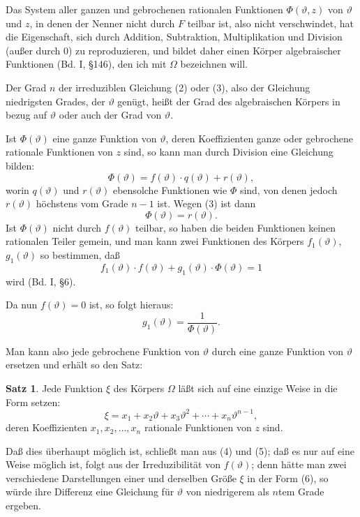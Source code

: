 \documentclass[12pt,a4paper]{article}
\theoremstyle{definition}
\newtheorem{satz}{Satz}[section]
\begin{document}
Das System aller ganzen und gebrochenen rationalen Funktionen $\Phi(\vartheta, z)$ von $\vartheta$ und $z$, in denen der Nenner nicht durch $F$ teilbar ist, also nicht verschwindet, hat die Eigenschaft, sich durch Addition, Subtraktion, Multiplikation und Division (außer durch 0) zu reproduzieren, und bildet daher einen Körper algebraischer Funktionen (Bd. I, \S 146), den ich mit $\Omega$ bezeichnen will.

Der Grad $n$ der irreduziblen Gleichung (2) oder (3), also der Gleichung niedrigsten Grades, der $\vartheta$ genügt, heißt der Grad des algebraischen Körpers in bezug auf $\vartheta$ oder auch der Grad von $\vartheta$.

Ist $\Phi(\vartheta)$ eine ganze Funktion von $\vartheta$, deren Koeffizienten ganze oder gebrochene rationale Funktionen von $z$ sind, so kann man durch Division eine Gleichung bilden:
\[\Phi(\vartheta) = f(\vartheta) \cdot q(\vartheta) + r(\vartheta),\]
worin $q(\vartheta)$ und $r(\vartheta)$ ebensolche Funktionen wie $\Phi$ sind, von denen jedoch $r(\vartheta)$ höchstens vom Grade $n-1$ ist. Wegen (3) ist dann
\[\Phi(\vartheta) = r(\vartheta).\]
Ist $\Phi(\vartheta)$ nicht durch $f(\vartheta)$ teilbar, so haben die beiden Funktionen keinen rationalen Teiler gemein, und man kann zwei Funktionen des Körpers $f_1(\vartheta)$, $g_1(\vartheta)$ so bestimmen, daß
\[f_1(\vartheta) \cdot f(\vartheta) + g_1(\vartheta) \cdot \Phi(\vartheta) = 1\]
wird (Bd. I, \S 6).

Da nun $f(\vartheta) = 0$ ist, so folgt hieraus:
\begin{equation}
g_1(\vartheta) = \frac{1}{\Phi(\vartheta)}.
\end{equation}

Man kann also jede gebrochene Funktion von $\vartheta$ durch eine ganze Funktion von $\vartheta$ ersetzen und erhält so den Satz:

\begin{satz}
Jede Funktion $\xi$ des Körpers $\Omega$ läßt sich auf eine einzige Weise in die Form setzen:
\begin{equation}
\xi = x_1 + x_2 \vartheta + x_3 \vartheta^2 + \cdots + x_n \vartheta^{n-1},
\end{equation}
deren Koeffizienten $x_1, x_2, \ldots, x_n$ rationale Funktionen von $z$ sind.
\end{satz}

Daß dies überhaupt möglich ist, schließt man aus (4) und (5); daß es nur auf eine Weise möglich ist, folgt aus der Irreduzibilität von $f(\vartheta)$; denn hätte man zwei verschiedene Darstellungen einer und derselben Größe $\xi$ in der Form (6), so würde ihre Differenz eine Gleichung für $\vartheta$ von niedrigerem als $n$tem Grade ergeben.
\end{document}
